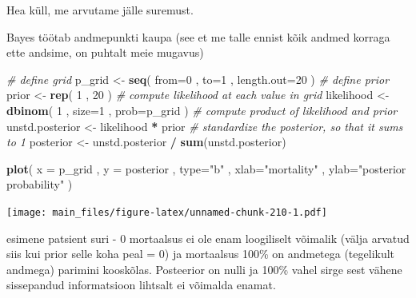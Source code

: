 \documentclass[]{book}
\newenvironment{Shaded}{\begin{snugshade}}{\end{snugshade}}
\newcommand{\KeywordTok}[1]{\textcolor[rgb]{0.13,0.29,0.53}{\textbf{#1}}}
\newcommand{\DataTypeTok}[1]{\textcolor[rgb]{0.13,0.29,0.53}{#1}}
\newcommand{\DecValTok}[1]{\textcolor[rgb]{0.00,0.00,0.81}{#1}}
\newcommand{\StringTok}[1]{\textcolor[rgb]{0.31,0.60,0.02}{#1}}
\newcommand{\CommentTok}[1]{\textcolor[rgb]{0.56,0.35,0.01}{\textit{#1}}}
\newcommand{\OperatorTok}[1]{\textcolor[rgb]{0.81,0.36,0.00}{\textbf{#1}}}
\newcommand{\NormalTok}[1]{#1}
\begin{document}
Hea küll, me arvutame jälle suremust.

Bayes töötab andmepunkti kaupa (see et me talle ennist kõik andmed
korraga ette andsime, on puhtalt meie mugavus)

\begin{Shaded}
\begin{Highlighting}[]
\CommentTok{# define grid}
\NormalTok{p_grid <-}\StringTok{ }\KeywordTok{seq}\NormalTok{( }\DataTypeTok{from=}\DecValTok{0}\NormalTok{ , }\DataTypeTok{to=}\DecValTok{1}\NormalTok{ , }\DataTypeTok{length.out=}\DecValTok{20}\NormalTok{ )}
\CommentTok{# define prior}
\NormalTok{prior <-}\StringTok{ }\KeywordTok{rep}\NormalTok{( }\DecValTok{1}\NormalTok{ , }\DecValTok{20}\NormalTok{ )}
\CommentTok{# compute likelihood at each value in grid}
\NormalTok{likelihood <-}\StringTok{ }\KeywordTok{dbinom}\NormalTok{( }\DecValTok{1}\NormalTok{ , }\DataTypeTok{size=}\DecValTok{1}\NormalTok{ , }\DataTypeTok{prob=}\NormalTok{p_grid )}
\CommentTok{# compute product of likelihood and prior}
\NormalTok{unstd.posterior <-}\StringTok{ }\NormalTok{likelihood }\OperatorTok{*}\StringTok{ }\NormalTok{prior}
\CommentTok{# standardize the posterior, so that it sums to 1}
\NormalTok{posterior <-}\StringTok{ }\NormalTok{unstd.posterior }\OperatorTok{/}\StringTok{ }\KeywordTok{sum}\NormalTok{(unstd.posterior)}

\KeywordTok{plot}\NormalTok{( }\DataTypeTok{x =}\NormalTok{ p_grid , }\DataTypeTok{y =}\NormalTok{ posterior , }\DataTypeTok{type=}\StringTok{"b"}\NormalTok{ ,}
    \DataTypeTok{xlab=}\StringTok{"mortality"}\NormalTok{ , }\DataTypeTok{ylab=}\StringTok{"posterior probability"}\NormalTok{ )}
\end{Highlighting}
\end{Shaded}

\texttt{[image: main\_files/figure-latex/unnamed-chunk-210-1.pdf]}

esimene patsient suri - 0 mortaalsus ei ole enam loogiliselt võimalik
(välja arvatud siis kui prior selle koha peal = 0) ja mortaalsus 100\%
on andmetega (tegelikult andmega) parimini kooskõlas. Posteerior on
nulli ja 100\% vahel sirge sest vähene sissepandud informatsioon
lihtsalt ei võimalda enamat.
\end{document}
